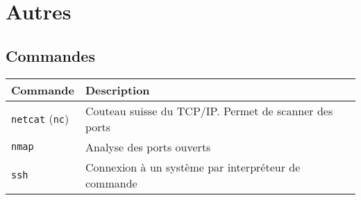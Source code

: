 \documentclass[resume]{subfiles}
\begin{document}
\section{Autres}
\subsection{Commandes}
\begin{table}[H]
\centering
\begin{tabular}{ll}
Commande & Description\\\hline
\verb!netcat! (\verb!nc!) & Couteau suisse du TCP/IP. Permet de scanner des ports\\
\verb!nmap! & Analyse des ports ouverts\\
\verb!ssh! & Connexion à un système par interpréteur de commande
\end{tabular}
\end{table}
\end{document}
